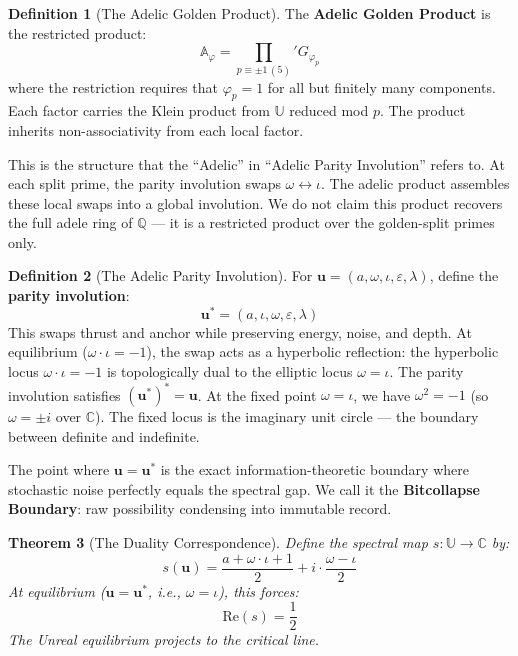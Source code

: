\documentclass[12pt,oneside]{article}
\theoremstyle{principia}
\newtheorem{theorem}{Theorem}[section]
\theoremstyle{definition}
\newtheorem{definition}[theorem]{Definition}
\theoremstyle{remark}
\providecommand{\UU}{\mathbb{U}}
\providecommand{\CC}{\mathbb{C}}
\providecommand{\QQ}{\mathbb{Q}}
\providecommand{\vp}{\varphi}
\providecommand{\eps}{\varepsilon}
\providecommand{\lam}{\lambda}
\begin{document}
\begin{definition}[The Adelic Golden Product]\label{def:adelic-product}
The \textbf{Adelic Golden Product} is the restricted product:
$$\mathbb{A}_\vp = \prod_{p \equiv \pm 1 \,(5)}' G_{\vp_p}$$
where the restriction requires that $\vp_p = 1$ for all but finitely many components. Each factor carries the Klein product from $\UU$ reduced mod $p$. The product inherits non-associativity from each local factor.
\end{definition}

This is the structure that the ``Adelic'' in ``Adelic Parity Involution'' refers to. At each split prime, the parity involution swaps $\omega \leftrightarrow \iota$. The adelic product assembles these local swaps into a global involution. We do not claim this product recovers the full adele ring of $\QQ$ --- it is a restricted product over the golden-split primes only.

\begin{definition}[The Adelic Parity Involution]\label{def:monster}
For $\mathbf{u} = (a, \omega, \iota, \eps, \lam)$, define the \textbf{parity involution}:
$$\mathbf{u}^* = (a, \iota, \omega, \eps, \lam)$$
This swaps thrust and anchor while preserving energy, noise, and depth. At equilibrium ($\omega \cdot \iota = -1$), the swap acts as a hyperbolic reflection: the hyperbolic locus $\omega \cdot \iota = -1$ is topologically dual to the elliptic locus $\omega = \iota$. The parity involution satisfies $(\mathbf{u}^*)^* = \mathbf{u}$. At the fixed point $\omega = \iota$, we have $\omega^2 = -1$ (so $\omega = \pm i$ over $\CC$). The fixed locus is the imaginary unit circle --- the boundary between definite and indefinite.
\end{definition}

The point where $\mathbf{u} = \mathbf{u}^*$ is the exact information-theoretic boundary where stochastic noise perfectly equals the spectral gap. We call it the \textbf{Bitcollapse Boundary}: raw possibility condensing into immutable record.

\begin{theorem}[The Duality Correspondence]\label{thm:duality}
Define the spectral map $s : \UU \to \CC$ by:
$$s(\mathbf{u}) = \frac{a + \omega \cdot \iota + 1}{2} + i \cdot \frac{\omega - \iota}{2}$$
At equilibrium ($\mathbf{u} = \mathbf{u}^*$, i.e., $\omega = \iota$), this forces:
$$\mathrm{Re}(s) = \frac{1}{2}$$
The Unreal equilibrium projects to the critical line.
\end{theorem}
\end{document}
